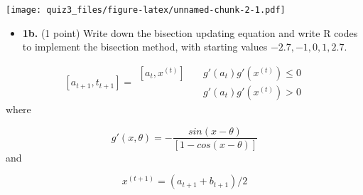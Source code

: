 \documentclass[
]{article}
\providecommand{\tightlist}{%
  \setlength{\itemsep}{0pt}\setlength{\parskip}{0pt}}
\begin{document}
\texttt{[image: quiz3\_files/figure-latex/unnamed-chunk-2-1.pdf]}

\begin{itemize}
\tightlist
\item
  \textbf{1b.} (1 point) Write down the bisection updating equation and
  write R codes to implement the bisection method, with starting values
  \(-2.7, -1, 0, 1, 2.7\).
\end{itemize}

\[[a_{t+1}, t_{t+1}] = \begin{array}{ll}
            [a_t, x^{(t)}]& \quad g'(a_t)g'(x^{(t)}) \le 0 \\
            [x^{(t)}, b_t]& \quad g'(a_t)g'(x^{(t)}) \gt 0
        \end{array}\] where

\[g'(x, \theta) = -\frac{sin(x - \theta)}{[1 - cos(x - \theta)]}\] and

\[x^{(t+1)} = (a_{t+1} + b_{t+1}) / 2\]
\end{document}
